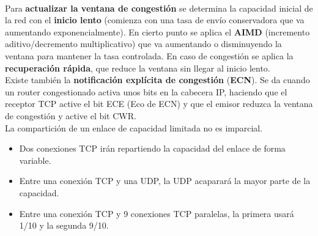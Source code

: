 \documentclass{article}
\begin{document}
\\

Para \textbf{actualizar la ventana de congestión} se determina la capacidad inicial de la red con el \textbf{inicio lento} (comienza con una tasa de envío conservadora que va aumentando exponencialmente). En cierto punto se aplica el \textbf{AIMD} (incremento aditivo/decremento multiplicativo) que va aumentando o disminuyendo la ventana para mantener la tasa controlada. En caso de congestión se aplica la \textbf{recuperación rápida}, que reduce la ventana sin llegar al inicio lento. \\

Existe también la \textbf{notificación explícita de congestión} (\textbf{ECN}). Se da cuando un router congestionado activa unos bits en la cabecera IP, haciendo que el receptor TCP active el bit ECE (Eco de ECN) y que el emisor reduzca la ventana de congestión y active el bit CWR. \\

La compartición de un enlace de capacidad limitada no es imparcial.
\begin{itemize}
    \item Dos conexiones TCP irán repartiendo la capacidad del enlace de forma variable.
    \item Entre una conexión TCP y una UDP, la UDP acaparará la mayor parte de la capacidad.
    \item Entre una conexión TCP y 9 conexiones TCP paralelas, la primera usará 1/10 y la segunda 9/10.
\end{itemize}
\end{document}

